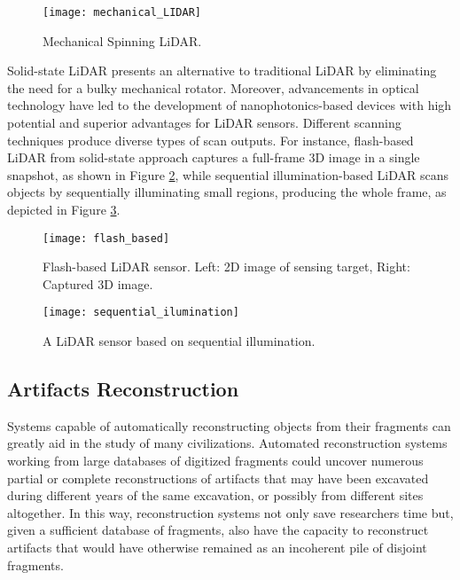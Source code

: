  
\begin{figure}[h!]
    \centering
    \texttt{[image: mechanical\_LIDAR]}
    \caption{Mechanical Spinning \gls{LiDAR}.~\cite{inbook}}
    \label{fig:mechanical_LIDAR}
\end{figure} 
\FloatBarrier


Solid-state \gls{LiDAR} presents an alternative to traditional \gls{LiDAR} by eliminating the need for a bulky mechanical rotator. %
Moreover, advancements in optical technology have led to the development of nanophotonics-based devices with high potential and superior advantages for \gls{LiDAR} sensors. %
Different scanning techniques produce diverse types of scan outputs. For instance, flash-based LiDAR from solid-state approach captures a full-frame \gls{3D} image in a single snapshot, as shown in Figure \ref{fig:flash_based}, while sequential illumination-based LiDAR scans objects by sequentially illuminating small regions, producing the whole frame, as depicted in Figure \ref{fig:sequential_ilumination}.

\begin{figure}[h!]
    \centering
    \texttt{[image: flash\_based]}
    \caption{Flash-based \gls{LiDAR} sensor. \small{Left: \gls{2D} image of sensing target, Right: Captured \gls{3D} image.} ~\cite{li2022progress}}
    \label{fig:flash_based}
\end{figure} 



\begin{figure}[h!]
    \centering
    \texttt{[image: sequential\_ilumination]}
    \caption{A \gls{LiDAR} sensor based on sequential illumination.~\cite{li2022progress}}
    \label{fig:sequential_ilumination}
\end{figure} 

\FloatBarrier

\subsection{Artifacts Reconstruction}
\label{sec:reconstruction}

Systems capable of automatically reconstructing objects from their fragments can greatly aid in the study of many civilizations.
Automated reconstruction systems working from large databases of digitized fragments could uncover numerous partial or
complete reconstructions of artifacts that may have been excavated during different years of the same excavation, or possibly
from different sites altogether. In this way, reconstruction systems not only save researchers time but, given a sufficient database 
of fragments, also have the capacity to reconstruct artifacts that would have otherwise remained as an incoherent pile of disjoint fragments.
~\cite{willis2008computational}

